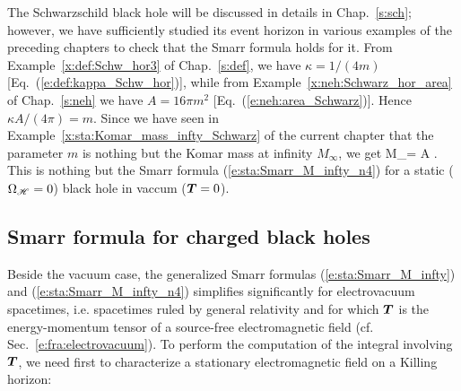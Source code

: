 \begin{example}
The Schwarzschild black hole will be discussed in details in Chap.~\ref{s:sch};
however, we have sufficiently studied its event horizon in various examples
of the preceding chapters to check that the Smarr formula holds
for it. From Example~\ref{x:def:Schw_hor3} of Chap.~\ref{s:def}, we have
$\kappa = 1/(4 m)$ [Eq.~(\ref{e:def:kappa_Schw_hor})], while from
Example~\ref{x:neh:Schwarz_hor_area} of Chap.~\ref{s:neh} we have
$A = 16\pi m^2$ [Eq.~(\ref{e:neh:area_Schwarz})]. Hence
$\kappa A / (4\pi) = m$. Since we have seen in Example~\ref{x:sta:Komar_mass_infty_Schwarz}
of the current chapter that the parameter $m$ is nothing but the Komar mass
at infinity $M_\infty$, we get
\be
    M_\infty = \frac{\kappa}{4\pi} A .
\ee
This is nothing but the Smarr formula (\ref{e:sta:Smarr_M_infty_n4})
for a static ($\Omega_{\mathscr{H}} = 0$) black hole in vaccum ($\bm{T}=0$).
\end{example}

\subsection{Smarr formula for charged black holes} \label{s:sta:Smarr_electrovac}

Beside the vacuum case, the generalized Smarr formulas (\ref{e:sta:Smarr_M_infty})
and (\ref{e:sta:Smarr_M_infty_n4}) simplifies significantly for
electrovacuum spacetimes, i.e. spacetimes ruled by general relativity and
for which $\bm{T}$ is the energy-momentum
tensor of a source-free electromagnetic field (cf. Sec.~\ref{e:fra:electrovacuum}).
To perform the computation of the integral involving $\bm{T}$,
we need first to characterize a stationary electromagnetic field on
a Killing horizon:

